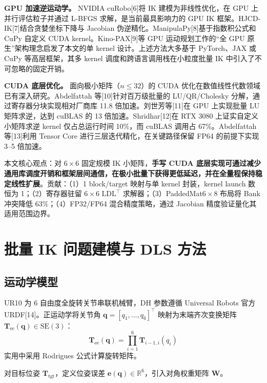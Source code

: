 \documentclass[twocolumn,a4paper,10pt]{ctexart}
\begin{document}
{\bfseries GPU 加速逆运动学。} NVIDIA cuRobo[6]将 IK 建模为非线性优化，在 GPU 上并行评估粒子并通过 L-BFGS 求解，是当前最具影响力的 GPU IK 框架。HJCD-IK[7]结合贪婪坐标下降与 Jacobian 伪逆精化。ManipulaPy[8]基于指数积公式和 CuPy 自定义 CUDA kernel。Kino-PAX[9]等 GPU 运动规划工作的``全 GPU 原生''架构理念启发了本文的单 kernel 设计。上述方法大多基于 PyTorch、JAX 或 CuPy 等高层框架，其多 kernel 调度和跨语言调用栈在小粒度批量 IK 中引入了不可忽略的固定开销。

{\bfseries CUDA 底层优化。} 面向极小矩阵（$n\le32$）的 CUDA 优化在数值线性代数领域已有深入研究。Abdelfattah 等[10]针对百万级批量的 LU/QR/Cholesky 分解，通过寄存器分块实现相对厂商库 11.8 倍加速。刘世芳等[11]在 GPU 上实现批量 LU 矩阵求逆，达到 cuBLAS 的 13 倍加速。Shridhar[12]在 RTX 3080 上证实自定义小矩阵求逆 kernel 仅占总运行时间 10\%，而 cuBLAS 调用占 67\%。Abdelfattah 等[13]利用 Tensor Core 进行三层迭代精化，在关键路径保留 FP64 的前提下实现 3--5 倍加速。

本文核心观点：对 $6\times6$ 固定规模 IK 小矩阵，{\bfseries 手写 CUDA 底层实现可通过减少通用库调度开销和框架层间通信，在极小批量下获得更低延迟，并在全量程保持稳定线性扩展}。贡献：（1）1 block/target 映射与单 kernel 封装，kernel launch 数恒为 1；（2）寄存器驻留 $6\times6$ $\mathrm{LDL}^\top$ 求解器；（3）PaddedMat$6\times8$ 布局将 Bank 冲突降低 63\%；（4）FP32/FP64 混合精度策略，通过 Jacobian 精度验证量化其适用范围边界。

\section{批量 IK 问题建模与 DLS 方法}\label{sec:model}

\subsection{运动学模型}

UR10 为 6 自由度全旋转关节串联机械臂，DH 参数遵循 Universal Robots 官方 URDF[14]。正运动学将关节角 $\mathbf{q}=[q_1,\ldots,q_6]^\top$ 映射为末端齐次变换矩阵 $\mathbf{T}_{\mathrm{ee}}(\mathbf{q})\in\mathrm{SE}(3)$：
\begin{equation}
\mathbf{T}_{\mathrm{ee}}(\mathbf{q}) = \prod_{i=1}^{6} \mathbf{T}_{i-1,i}(q_i)\label{eq:fk}
\end{equation}
实用中采用 Rodrigues 公式计算旋转矩阵。

对目标位姿 $\mathbf{T}_{\mathrm{tgt}}$，定义位姿误差 $\mathbf{e}(\mathbf{q})\in\mathbb{R}^6$，引入对角权重矩阵 $\mathbf{W}$。
\end{document}
